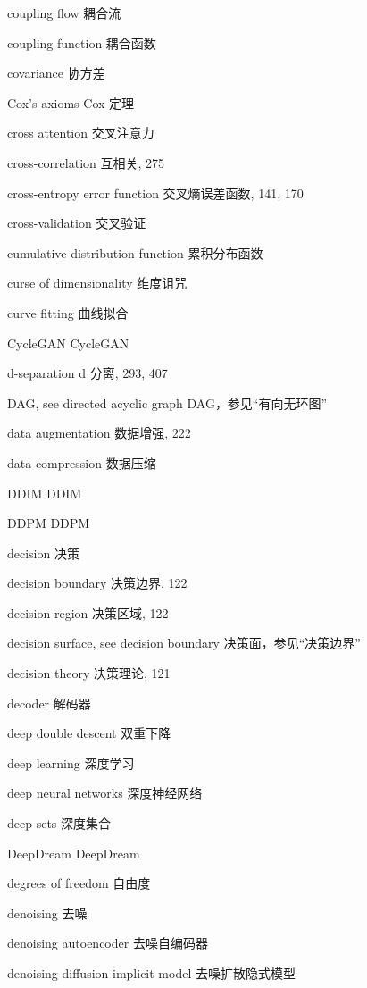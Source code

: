coupling flow 耦合流\par
coupling function 耦合函数\par
covariance 协方差\par
Cox’s axioms Cox 定理\par
cross attention 交叉注意力\par
cross-correlation 互相关, 275\par
cross-entropy error function 交叉熵误差函数, 141, 170\par
cross-validation 交叉验证\par
cumulative distribution function 累积分布函数\par
curse of dimensionality 维度诅咒\par
curve fitting 曲线拟合\par
CycleGAN CycleGAN\par
d-separation d 分离, 293, 407\par
DAG, see directed acyclic graph DAG，参见“有向无环图”\par
data augmentation 数据增强, 222\par
data compression 数据压缩\par
DDIM DDIM\par
DDPM DDPM\par
decision 决策\par
decision boundary 决策边界, 122\par
decision region 决策区域, 122\par
decision surface, see decision boundary 决策面，参见“决策边界”\par
decision theory 决策理论, 121\par
decoder 解码器\par
deep double descent 双重下降\par
deep learning 深度学习\par
deep neural networks 深度神经网络\par
deep sets 深度集合\par
DeepDream DeepDream\par
degrees of freedom 自由度\par
denoising 去噪\par
denoising autoencoder 去噪自编码器\par
denoising diffusion implicit model 去噪扩散隐式模型\par
